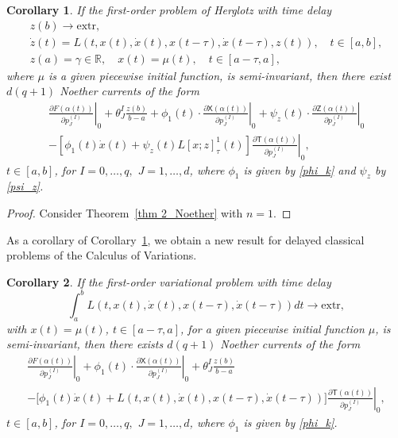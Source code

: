 \documentclass{my-aims}
\newtheorem{corollary}{Corollary}
\theoremstyle{definition}
\begin{document}
\begin{corollary}
\label{coroll:n=1}
If the first-order problem of Herglotz with time delay
\begin{equation*}
\begin{gathered}
z(b)\longrightarrow \mathrm{extr},\\
\dot{z}(t)=L\left(t,x(t),\dot{x}(t),x(t-\tau),\dot{x}(t-\tau),z(t)\right),
\quad t \in [a,b], \\
z(a)=\gamma \in \mathbb{R}, \quad x(t)=\mu(t), \quad t \in [a-\tau,a],
\end{gathered}
\end{equation*}
where $\mu$ is a given piecewise initial function, is semi-invariant, 
then there exist $d(q+1)$ Noether currents of the form
\begin{multline*}
\left.\frac{\partial F(\alpha(t))}{\partial p_J^{(I)}}\right|_0+\theta_J^I\frac{z(b)}{b-a}
+\phi_1(t)\cdot \left. \frac{\partial \mathsf{X}(\alpha(t))}{\partial p_J^{(I)}}\right|_0
+\psi_z(t)\cdot \left. \frac{\partial \mathsf{Z}(\alpha(t))}{\partial p_J^{(I)}}\right|_0\\
-\left.	\left[\phi_1(t)\dot{x}(t)+\psi_z(t)L[x;z]_\tau^1(t)\right]
\frac{\partial \mathsf{T}(\alpha(t))}{\partial p_J^{(I)}}\right|_0,
\end{multline*}
$t \in [a,b]$, for $I=0,\dots,q,$ $J=1,\dots,d$, where $\phi_1$ 
is given by \eqref{phi_k} and $\psi_z$ by \eqref{psi_z}.
\end{corollary}

\begin{proof}
Consider Theorem~\ref{thm 2_Noether} with $n=1$.
\end{proof}

As a corollary of Corollary~\ref{coroll:n=1}, we obtain a new result 
for delayed classical problems of the Calculus of Variations.

\begin{corollary}
\label{coroll:2}
If the first-order variational problem with time delay 
\begin{equation*}
\int_a^b L(t,x(t),\dot{x}(t),x(t-\tau),\dot{x}(t-\tau))dt \longrightarrow \mathrm{extr},
\end{equation*}
with $x(t)=\mu(t)$, $t \in [a-\tau,a]$, for a given piecewise initial function $\mu$, 
is semi-invariant, then there exists $d(q+1)$ Noether currents of the form
\begin{multline*}
\left.\frac{\partial F(\alpha(t))}{\partial p_J^{(I)}}\right|_0
+\phi_1(t)\cdot \left. \frac{\partial \mathsf{X}(\alpha(t))}{\partial p_J^{(I)}}\right|_0
+\theta^{I}_{J}\frac{z(b)}{b-a}\\
-\left.	\Big[\phi_1(t)\dot{x}(t)+L\left(t,x(t),\dot{x}(t),x(t-\tau),\dot{x}(t-\tau)\right)\Big]
\frac{\partial \mathsf{T}(\alpha(t))}{\partial p_J^{(I)}}\right|_0,
\end{multline*}
$t \in [a,b]$, for $I=0,\dots,q,$ $J=1,\dots,d$, 
where $\phi_1$ is given by \eqref{phi_k}.
\end{corollary}
\end{document}
